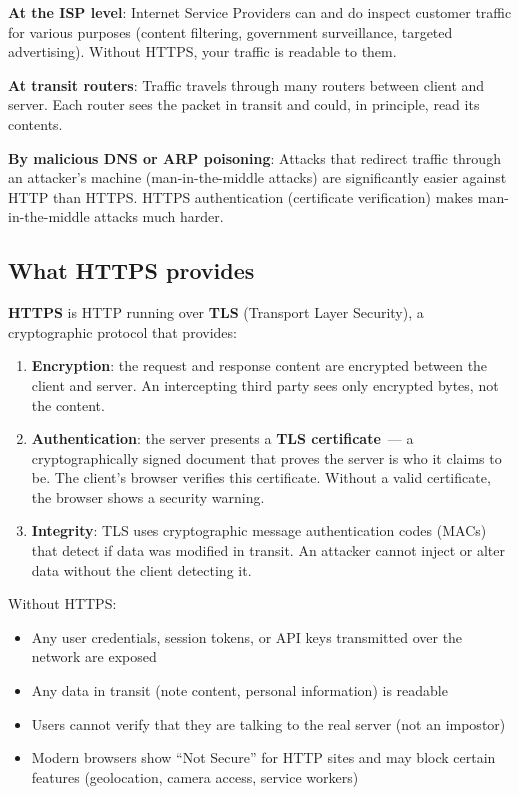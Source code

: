 \textbf{At the ISP level}: Internet Service Providers can and do inspect customer traffic for various purposes (content filtering, government surveillance, targeted advertising). Without HTTPS, your traffic is readable to them.

\textbf{At transit routers}: Traffic travels through many routers between client and server. Each router sees the packet in transit and could, in principle, read its contents.

\textbf{By malicious DNS or ARP poisoning}: Attacks that redirect traffic through an attacker's machine (man-in-the-middle attacks) are significantly easier against HTTP than HTTPS. HTTPS authentication (certificate verification) makes man-in-the-middle attacks much harder.

\subsection*{What HTTPS provides}\label{11-reliability-security-gaps:what-https-provides}

\textbf{HTTPS} is HTTP running over \textbf{TLS} (Transport Layer Security), a cryptographic protocol that provides:

\begin{enumerate}
\def\labelenumi{\arabic{enumi}.}
\item
  \textbf{Encryption}: the request and response content are encrypted between the client and server. An intercepting third party sees only encrypted bytes, not the content.
\item
  \textbf{Authentication}: the server presents a \textbf{TLS certificate}~--- a cryptographically signed document that proves the server is who it claims to be. The client's browser verifies this certificate. Without a valid certificate, the browser shows a security warning.
\item
  \textbf{Integrity}: TLS uses cryptographic message authentication codes (MACs) that detect if data was modified in transit. An attacker cannot inject or alter data without the client detecting it.
\end{enumerate}

\noindent{}Without HTTPS:

\begin{itemize}
\tightlist
\item
  Any user credentials, session tokens, or API keys transmitted over the network are exposed
\item
  Any data in transit (note content, personal information) is readable
\item
  Users cannot verify that they are talking to the real server (not an impostor)
\item
  Modern browsers show ``Not Secure'' for HTTP sites and may block certain features (geolocation, camera access, service workers)
\end{itemize}

